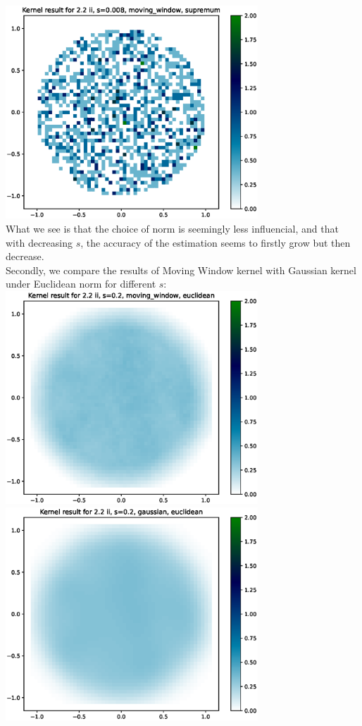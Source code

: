 \documentclass{article}
\begin{document}
\includegraphics[height=8cm]{comparisons//Kernel_result_2-2ii_s_0-008_moving_window_supremum.eps} \vspace*{-2em} \\
What we see is that the choice of norm is seemingly less influencial, and that with decreasing $s$, the accuracy of the estimation seems to firstly grow but then decrease. \\
\noindent Secondly, we compare the results of Moving Window kernel with Gaussian kernel under Euclidean norm for different $s$: \\
\hspace*{-1.5cm}\includegraphics[height=8cm]{comparisons//Kernel_result_2-2ii_s_0-2_moving_window_euclidean.eps} \hspace*{-1.5cm}
\includegraphics[height=8cm]{comparisons//Kernel_result_2-2ii_s_0-2_gaussian_euclidean.eps} \vspace*{-3em} \\
\end{document}
